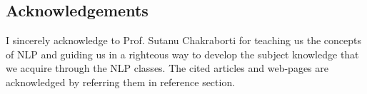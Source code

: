 \documentclass{bmcart}
\begin{document}
\begin{backmatter}

\section*{Acknowledgements}
 I sincerely acknowledge to Prof. Sutanu Chakraborti for teaching us the concepts of NLP and guiding us in a righteous way to develop the subject knowledge that we acquire through the NLP classes. The cited articles and web-pages are acknowledged by referring them in reference section. 

\newpage 
\end{backmatter}
\end{document}
